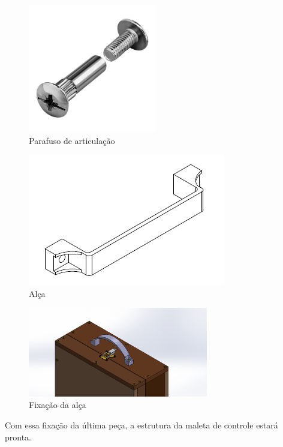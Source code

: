 \begin{figure}[H]
    \centering
    \includegraphics[width=0.5\textwidth]{Figuras/montagemMaletasEstrutura/parafusoUniao.jpg}
    \caption{Parafuso de articulação}
    \label{fig:controleArticulacaoParafuso}
\end{figure}

\begin{figure} [H]
    \centering
    \includegraphics[width=.5\textwidth]{Figuras/gcs/alca.png}
    \caption{Alça}
    \label{fig:alca}
\end{figure}

\begin{figure}[H]
    \centering
    \includegraphics[width=0.7\textwidth]{Figuras/montagemMaletasEstrutura/controleAlca.png}
    \caption{Fixação da alça}
    \label{fig:controleAlca}
\end{figure}

Com essa fixação da última peça, a estrutura da maleta de controle estará pronta.

